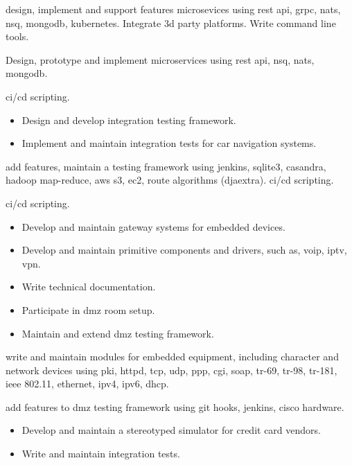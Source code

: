 \documentclass[10pt,a4paper,ragged2e,withhyper]{altacv}
\begin{document}
 design, implement and support features microsevices using rest
api, grpc, nats, nsq, mongodb, kubernetes. Integrate 3d party platforms. Write
command line tools.

 Design, prototype and implement microservices using rest api,
nsq, nats, mongodb.

 ci/cd scripting.

\divider

\begin{itemize}
\item Design and develop integration testing framework.
\item Implement and maintain integration tests for car navigation systems.
\end{itemize}


 add features, maintain a testing framework using jenkins,
sqlite3, casandra, hadoop map-reduce, aws s3, ec2, route algorithms (djaextra).
ci/cd scripting.

 ci/cd scripting.

\divider

\begin{itemize}
\item Develop and maintain gateway systems for embedded devices.
\item Develop and maintain primitive components and drivers, such as, voip, iptv, vpn.
\item Write technical documentation.
\item Participate in dmz room setup.
\item Maintain and extend dmz testing framework.
\end{itemize}


 write and maintain modules for embedded equipment, including character
and network devices using pki, httpd, tcp, udp, ppp, cgi, soap, tr-69, tr-98,
tr-181, ieee 802.11, ethernet, ipv4, ipv6, dhcp.

 add features to dmz testing framework using git hooks, jenkins,
cisco hardware.

\divider
\break
\break
\break
\break
\break
\break

\begin{itemize}
\item Develop and maintain a stereotyped simulator for credit card vendors.
\item Write and maintain integration tests.
\end{itemize}
\end{document}
